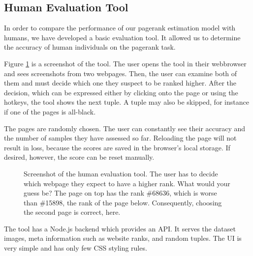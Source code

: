 \subsection{Human Evaluation Tool}
\label{sec:humanevaltool}

In order to compare the performance of our pagerank estimation model with humans, we have developed a basic evaluation tool. It allowed us to determine the accuracy of human individuals on the pagerank task.

Figure \ref{fig:humanevalscreenshot} is a screenshot of the tool. The user opens the tool in their webbrowser and sees screenshots from two webpages. Then, the user can examine both of them and must decide which one they suspect to be ranked higher. After the decision, which can be expressed either by clicking onto the page or using the hotkeys, the tool shows the next tuple. A tuple may also be skipped, for instance if one of the pages is all-black.

The pages are randomly chosen. The user can constantly see their accuracy and the number of samples they have assessed so far. Reloading the page will not result in loss, because the scores are saved in the browser's local storage. If desired, however, the score can be reset manually.

\begin{figure}\centering
    \caption[Screenshot of the human evaluation tool]{Screenshot of the human evaluation tool. The user has to decide which webpage they expect to have a higher rank. What would your guess be? The page on top has the rank \#68636, which is worse than \#15898, the rank of the page below. Consequently, choosing the second page is correct, here.}\label{fig:humanevalscreenshot}
\end{figure}

The tool has a Node.js backend which provides an API. It serves the dataset images, meta information such as website ranks, and random tuples. The UI is very simple and has only few CSS styling rules.
